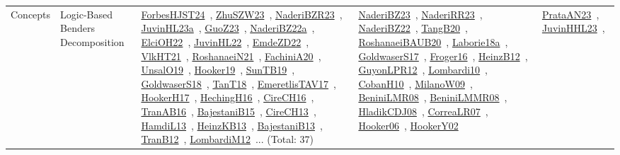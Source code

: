 {\begin{longtable}{lp{3cm}>{\raggedright\arraybackslash}p{6cm}>{\raggedright\arraybackslash}p{6cm}>{\raggedright\arraybackslash}p{8cm}}
\index{Logic-Based Benders Decomposition}\index{Concepts!Logic-Based Benders Decomposition}Concepts & Logic-Based Benders Decomposition & \href{../works/ForbesHJST24.pdf}{ForbesHJST24}~\cite{ForbesHJST24}, \href{../works/ZhuSZW23.pdf}{ZhuSZW23}~\cite{ZhuSZW23}, \href{../works/NaderiBZR23.pdf}{NaderiBZR23}~\cite{NaderiBZR23}, \href{../works/JuvinHL23a.pdf}{JuvinHL23a}~\cite{JuvinHL23a}, \href{../works/GuoZ23.pdf}{GuoZ23}~\cite{GuoZ23}, \href{../works/NaderiBZ22a.pdf}{NaderiBZ22a}~\cite{NaderiBZ22a}, \href{../works/ElciOH22.pdf}{ElciOH22}~\cite{ElciOH22}, \href{../works/JuvinHL22.pdf}{JuvinHL22}~\cite{JuvinHL22}, \href{../works/EmdeZD22.pdf}{EmdeZD22}~\cite{EmdeZD22}, \href{../works/VlkHT21.pdf}{VlkHT21}~\cite{VlkHT21}, \href{../works/RoshanaeiN21.pdf}{RoshanaeiN21}~\cite{RoshanaeiN21}, \href{../works/FachiniA20.pdf}{FachiniA20}~\cite{FachiniA20}, \href{../works/UnsalO19.pdf}{UnsalO19}~\cite{UnsalO19}, \href{../works/Hooker19.pdf}{Hooker19}~\cite{Hooker19}, \href{../works/SunTB19.pdf}{SunTB19}~\cite{SunTB19}, \href{../works/GoldwaserS18.pdf}{GoldwaserS18}~\cite{GoldwaserS18}, \href{../works/TanT18.pdf}{TanT18}~\cite{TanT18}, \href{../works/EmeretlisTAV17.pdf}{EmeretlisTAV17}~\cite{EmeretlisTAV17}, \href{../works/HookerH17.pdf}{HookerH17}~\cite{HookerH17}, \href{../works/HechingH16.pdf}{HechingH16}~\cite{HechingH16}, \href{../works/CireCH16.pdf}{CireCH16}~\cite{CireCH16}, \href{../works/TranAB16.pdf}{TranAB16}~\cite{TranAB16}, \href{../works/BajestaniB15.pdf}{BajestaniB15}~\cite{BajestaniB15}, \href{../works/CireCH13.pdf}{CireCH13}~\cite{CireCH13}, \href{../works/HamdiL13.pdf}{HamdiL13}~\cite{HamdiL13}, \href{../works/HeinzKB13.pdf}{HeinzKB13}~\cite{HeinzKB13}, \href{../works/BajestaniB13.pdf}{BajestaniB13}~\cite{BajestaniB13}, \href{../works/TranB12.pdf}{TranB12}~\cite{TranB12}, \href{../works/LombardiM12.pdf}{LombardiM12}~\cite{LombardiM12}... (Total: 37) & \href{../works/NaderiBZ23.pdf}{NaderiBZ23}~\cite{NaderiBZ23}, \href{../works/NaderiRR23.pdf}{NaderiRR23}~\cite{NaderiRR23}, \href{../works/NaderiBZ22.pdf}{NaderiBZ22}~\cite{NaderiBZ22}, \href{../works/TangB20.pdf}{TangB20}~\cite{TangB20}, \href{../works/RoshanaeiBAUB20.pdf}{RoshanaeiBAUB20}~\cite{RoshanaeiBAUB20}, \href{../works/Laborie18a.pdf}{Laborie18a}~\cite{Laborie18a}, \href{../works/GoldwaserS17.pdf}{GoldwaserS17}~\cite{GoldwaserS17}, \href{../works/Froger16.pdf}{Froger16}~\cite{Froger16}, \href{../works/HeinzB12.pdf}{HeinzB12}~\cite{HeinzB12}, \href{../works/GuyonLPR12.pdf}{GuyonLPR12}~\cite{GuyonLPR12}, \href{../works/Lombardi10.pdf}{Lombardi10}~\cite{Lombardi10}, \href{../works/CobanH10.pdf}{CobanH10}~\cite{CobanH10}, \href{../works/MilanoW09.pdf}{MilanoW09}~\cite{MilanoW09}, \href{../works/BeniniLMR08.pdf}{BeniniLMR08}~\cite{BeniniLMR08}, \href{../works/BeniniLMMR08.pdf}{BeniniLMMR08}~\cite{BeniniLMMR08}, \href{../works/HladikCDJ08.pdf}{HladikCDJ08}~\cite{HladikCDJ08}, \href{../works/CorreaLR07.pdf}{CorreaLR07}~\cite{CorreaLR07}, \href{../works/Hooker06.pdf}{Hooker06}~\cite{Hooker06}, \href{../works/HookerY02.pdf}{HookerY02}~\cite{HookerY02} & \href{../works/PrataAN23.pdf}{PrataAN23}~\cite{PrataAN23}, \href{../works/JuvinHHL23.pdf}{JuvinHHL23}~\cite{JuvinHHL23}, 
\end{longtable}}
